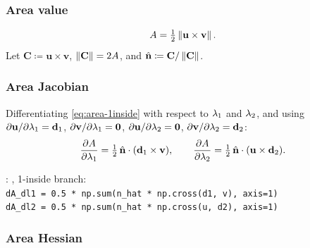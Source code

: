 \documentclass[11pt,a4paper]{article}
\begin{document}
\subsubsection{Area value}

\begin{equation}
  A = \tfrac{1}{2}\left\|\mathbf{u} \times \mathbf{v}\right\|.
  \label{eq:area-1inside}
\end{equation}
Let $\mathbf{C} \coloneqq \mathbf{u} \times \mathbf{v}$,
$\left\|\mathbf{C}\right\| = 2A$, and $\hat{\mathbf{n}} \coloneqq \mathbf{C}/\left\|\mathbf{C}\right\|$.

\subsubsection{Area Jacobian}

Differentiating \eqref{eq:area-1inside} with respect to $\lambda_1$ and
$\lambda_2$, and using $\partial\mathbf{u}/\partial\lambda_1 = \mathbf{d}_{1}$,
$\partial\mathbf{v}/\partial\lambda_1 = \mathbf{0}$,
$\partial\mathbf{u}/\partial\lambda_2 = \mathbf{0}$,
$\partial\mathbf{v}/\partial\lambda_2 = \mathbf{d}_{2}$:
\begin{equation}
  \dfrac{\partial A}{\partial \lambda_1}
    = \tfrac{1}{2}\,\hat{\mathbf{n}} \cdot (\mathbf{d}_{1} \times \mathbf{v}),
  \qquad
  \dfrac{\partial A}{\partial \lambda_2}
    = \tfrac{1}{2}\,\hat{\mathbf{n}} \cdot (\mathbf{u} \times \mathbf{d}_{2}).
  \label{eq:area-jac-1inside}
\end{equation}

\begin{tcolorbox}[colback=blue!4!white, colframe=blue!40!black,
                  title={Code: 1-inside Jacobian}, fontupper=\small]
: ,
1-inside branch:\\[2pt]
\texttt{dA\_dl1 = 0.5 * np.sum(n\_hat * np.cross(d1, v), axis=1)}\\
\texttt{dA\_dl2 = 0.5 * np.sum(n\_hat * np.cross(u, d2), axis=1)}
\end{tcolorbox}

\subsubsection{Area Hessian}
\label{sec:area-hessian-1inside}
\end{document}

